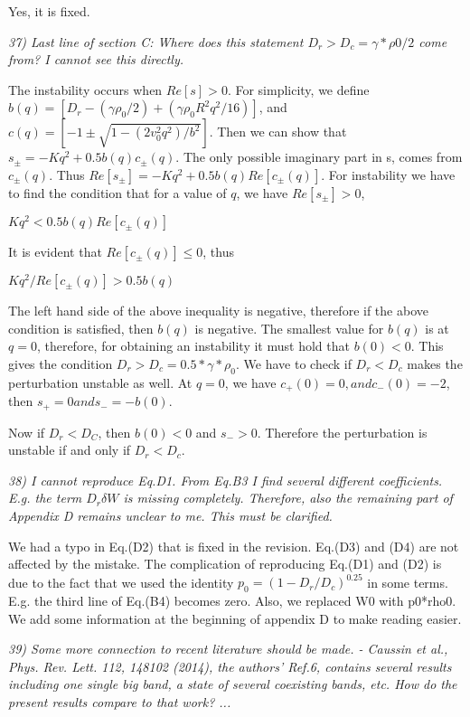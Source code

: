 \documentclass[a4paper,11pt]{letter}
\newcommand{\rf}[1]{\textit{\textcolor{hlcolor}{#1}}}
\begin{document}
Yes, it is fixed.

\rf{37) Last line of section C: Where does this statement $D_r>D_c=\gamma*\rho0/2$ come from? I cannot see this directly.}

The instability occurs when $Re[s] > 0$. For simplicity, we define $b(q) = [D_r - (\gamma \rho_0 / 2) + (\gamma \rho_0 R^2 q^2 / 16)]$, and $c(q) = [-1 \pm \sqrt{1 - (2 v_0^2 q^2) / b^2}]$. Then we can show that $s_{\pm} = -K q^2 + 0.5 b(q) c_{\pm}(q)$. The only possible imaginary part in s, comes from $c_{\pm}(q)$. Thus $Re[s_{\pm}] = -K q^2 + 0.5 b(q) Re[c_{\pm}(q)]$. For instability we have to find the condition that for a value of $q$, we have $Re[s_{\pm}] > 0$,

$K q^2 < 0.5 b(q) Re[c_{\pm}(q)]$

It is evident that $Re[c_{\pm}(q)] \leq 0$, thus

$K q^2 / Re[c_{\pm}(q)] > 0.5 b(q)$

The left hand side of the above inequality is negative, therefore if the above condition is satisfied, then $b(q)$ is negative. The smallest value for $b(q)$ is at $q=0$, therefore, for obtaining an instability it must hold that $b(0)< 0$. This gives the condition $D_r > D_c = 0.5*\gamma*\rho_0$. We have to check if $D_r < D_c$ makes the perturbation unstable as well. At $q=0$, we have $c_{+}(0) = 0, and c_{-}(0) = -2$, then $s_{+} = 0 and s_{-} = -b(0)$. 

Now if $D_r < D_C$, then $b(0) < 0$ and $s_{-} > 0$. Therefore the perturbation is unstable if and only if $D_r < D_c$.

\rf{38) I cannot reproduce Eq.D1. From Eq.B3 I find several different coefficients. E.g. the term $D_r \delta W$ is missing completely. Therefore, also the remaining part of Appendix D remains unclear to me. This must be clarified.}

We had a typo in Eq.(D2) that is fixed in the revision. Eq.(D3) and (D4) are not affected by the mistake. The complication of reproducing Eq.(D1) and (D2) is due to the fact that we used the identity $p_0 = (1-D_r/D_c)^{0.25}$ in some terms. E.g. the third line of Eq.(B4) becomes zero. Also, we replaced W0 with p0*rho0. We add some information at the beginning of appendix D to make reading easier.

\rf{39) Some more connection to recent literature should be made. - Caussin et al., Phys. Rev. Lett. 112, 148102 (2014), the authors' Ref.6, contains several results including one single big band, a state of several coexisting bands, etc. How do the present results compare to that work? ...}
\end{document}
